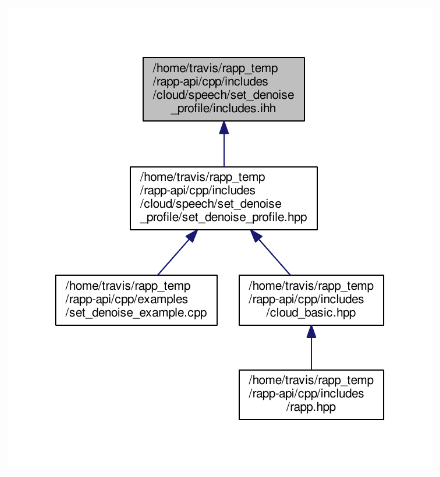 \begin{figure}[H]
\begin{center}
\leavevmode
\includegraphics[width=349pt]{cloud_2speech_2set__denoise__profile_2includes_8ihh__dep__incl}
\end{center}
\end{figure}
